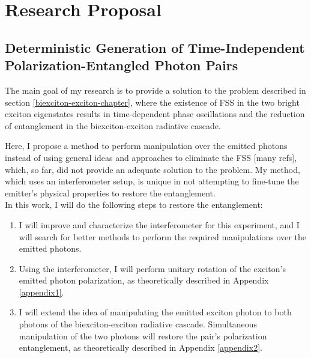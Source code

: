 \section{Research Proposal}
\subsection{Deterministic Generation of Time-Independent Polarization-Entangled Photon Pairs}
The main goal of my research is to provide a solution to the problem described in section \ref{biexciton-exciton-chapter}, where the existence of FSS in the two bright exciton eigenstates results in time-dependent phase oscillations and the reduction of entanglement in the biexciton-exciton radiative cascade.
\iffalse
The presence of the splitting in the lowest excitonic state is an unwanted effect in QDs that causes a degradation in the degree of entanglement between the two photons in the biexciton-exciton radiative cascade by lifting the degeneracy of the levels\cite{Winik2017}. This is due to several causes but mainly as a result of the asymmetry of the QD.$\newline$
\fi
Here, I propose a method to perform manipulation over the emitted photons instead of using general ideas and approaches to eliminate the FSS [many refs], which, so far, did not provide an adequate solution to the problem. My method, which uses an interferometer setup, is unique in not attempting to fine-tune the emitter's physical properties to restore the entanglement.\\
In this work, I will do the following steps to restore the entanglement:
\begin{enumerate}
	\item  I will improve and characterize the interferometer for this experiment, and I will search for better methods to perform the required manipulations over the emitted photons. 
	\item Using the interferometer, I will perform unitary rotation of the exciton's emitted photon polarization,  as theoretically described in Appendix \ref{appendix1}.

	\item I will extend the idea of manipulating the emitted exciton photon to both photons of the biexciton-exciton radiative cascade. Simultaneous manipulation of the two photons will restore the pair's polarization entanglement, as theoretically described in Appendix \ref{appendix2}.
\end{enumerate} 

